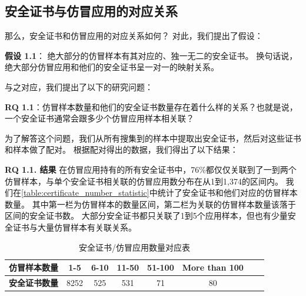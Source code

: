 \subsection{安全证书与仿冒应用的对应关系}
那么，安全证书和仿冒应用的对应关系如何？
对此，我们提出了假设：

{\bf 假设 1.1}： 绝大部分的仿冒样本有其对应的、独一无二的安全证书。
换句话说，绝大部分仿冒应用和他们的安全证书呈一对一的映射关系。

与之对应，我们提出了以下的研究问题：

{\bf RQ 1.1}：仿冒样本数量和他们的安全证书数量存在着什么样的关系？也就是说，一个安全证书通常会跟多少个仿冒应用样本相关联？

为了解答这个问题，我们从所有搜集到的样本中提取出安全证书，然后对这些证书和样本做了配对。
根据配对得出的数据，我们得出了以下结果：

{\bf RQ 1.1. 结果}
在仿冒应用持有的所有安全证书中，76\%都仅仅关联到了一到两个仿冒样本，与单个安全证书相关联的仿冒应用数分布在从1到1,374的区间内。
我们在\autoref{table:certificate_number_statistic}中统计了安全证书和他们对应的仿冒样本数量。
其中第一栏为仿冒样本的数量区间，第二栏为关联的仿冒样本数量该落于区间的安全证书数。
大部分安全证书都只关联了1到5个应用样本，但也有少量安全证书与大量仿冒样本有关联关系。

\begin{table}[htbp]
  \renewcommand{\arraystretch}{1}
  \footnotesize
  \centering
  \caption{安全证书/仿冒应用数量对应表}
  \vspace{1mm}
  \begin{tabular}{l c c c c c c c}
  \toprule
  {\bf 仿冒样本数量} & {\bf 1-5} & {\bf 6-10} & {\bf 11-50} & {\bf 51-100} & {\bf More than 100} \\
  \midrule
  {\bf 安全证书数量} & 8252 & 525 & 531 & 71 & 80 \\
  \bottomrule
  \end{tabular}
  \label{table:certificate_number_statistic}
\end{table}

